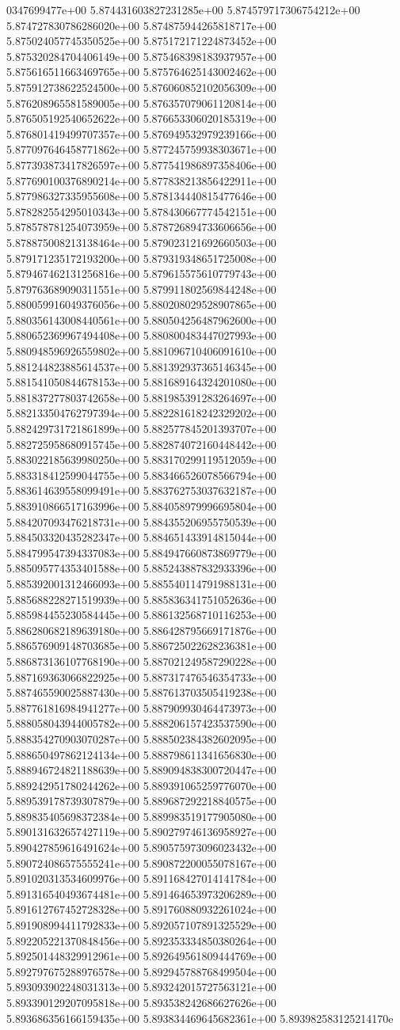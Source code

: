 0347699477e+00	5.874431603827231285e+00	5.874579717306754212e+00	5.874727830786286020e+00	5.874875944265818717e+00	5.875024057745350525e+00	5.875172171224873452e+00	5.875320284704406149e+00	5.875468398183937957e+00	5.875616511663469765e+00	5.875764625143002462e+00	5.875912738622524500e+00	5.876060852102056309e+00	5.876208965581589005e+00	5.876357079061120814e+00	5.876505192540652622e+00	5.876653306020185319e+00	5.876801419499707357e+00	5.876949532979239166e+00	5.877097646458771862e+00	5.877245759938303671e+00	5.877393873417826597e+00	5.877541986897358406e+00	5.877690100376890214e+00	5.877838213856422911e+00	5.877986327335955608e+00	5.878134440815477646e+00	5.878282554295010343e+00	5.878430667774542151e+00	5.878578781254073959e+00	5.878726894733606656e+00	5.878875008213138464e+00	5.879023121692660503e+00	5.879171235172193200e+00	5.879319348651725008e+00	5.879467462131256816e+00	5.879615575610779743e+00	5.879763689090311551e+00	5.879911802569844248e+00	5.880059916049376056e+00	5.880208029528907865e+00	5.880356143008440561e+00	5.880504256487962600e+00	5.880652369967494408e+00	5.880800483447027993e+00	5.880948596926559802e+00	5.881096710406091610e+00	5.881244823885614537e+00	5.881392937365146345e+00	5.881541050844678153e+00	5.881689164324201080e+00	5.881837277803742658e+00	5.881985391283264697e+00	5.882133504762797394e+00	5.882281618242329202e+00	5.882429731721861899e+00	5.882577845201393707e+00	5.882725958680915745e+00	5.882874072160448442e+00	5.883022185639980250e+00	5.883170299119512059e+00	5.883318412599044755e+00	5.883466526078566794e+00	5.883614639558099491e+00	5.883762753037632187e+00	5.883910866517163996e+00	5.884058979996695804e+00	5.884207093476218731e+00	5.884355206955750539e+00	5.884503320435282347e+00	5.884651433914815044e+00	5.884799547394337083e+00	5.884947660873869779e+00	5.885095774353401588e+00	5.885243887832933396e+00	5.885392001312466093e+00	5.885540114791988131e+00	5.885688228271519939e+00	5.885836341751052636e+00	5.885984455230584445e+00	5.886132568710116253e+00	5.886280682189639180e+00	5.886428795669171876e+00	5.886576909148703685e+00	5.886725022628236381e+00	5.886873136107768190e+00	5.887021249587290228e+00	5.887169363066822925e+00	5.887317476546354733e+00	5.887465590025887430e+00	5.887613703505419238e+00	5.887761816984941277e+00	5.887909930464473973e+00	5.888058043944005782e+00	5.888206157423537590e+00	5.888354270903070287e+00	5.888502384382602095e+00	5.888650497862124134e+00	5.888798611341656830e+00	5.888946724821188639e+00	5.889094838300720447e+00	5.889242951780244262e+00	5.889391065259776070e+00	5.889539178739307879e+00	5.889687292218840575e+00	5.889835405698372384e+00	5.889983519177905080e+00	5.890131632657427119e+00	5.890279746136958927e+00	5.890427859616491624e+00	5.890575973096023432e+00	5.890724086575555241e+00	5.890872200055078167e+00	5.891020313534609976e+00	5.891168427014141784e+00	5.891316540493674481e+00	5.891464653973206289e+00	5.891612767452728328e+00	5.891760880932261024e+00	5.891908994411792833e+00	5.892057107891325529e+00	5.892205221370848456e+00	5.892353334850380264e+00	5.892501448329912961e+00	5.892649561809444769e+00	5.892797675288976578e+00	5.892945788768499504e+00	5.893093902248031313e+00	5.893242015727563121e+00	5.893390129207095818e+00	5.893538242686627626e+00	5.893686356166159435e+00	5.893834469645682361e+00	5.893982583125214170e